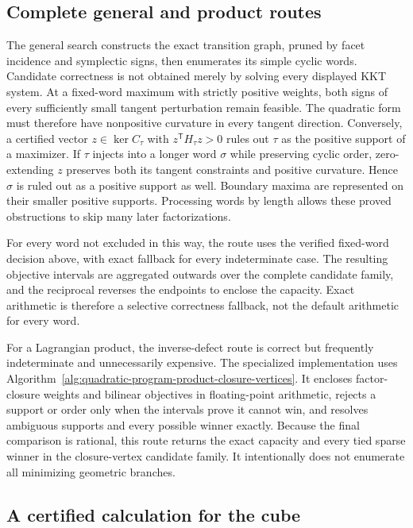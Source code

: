 \subsection{Complete general and product routes}

The general search constructs the exact transition graph, pruned by facet
incidence and symplectic signs, then enumerates its simple cyclic words. Candidate
correctness is not obtained merely by solving every displayed KKT system. At a
fixed-word maximum with strictly positive weights, both signs of every
sufficiently small tangent perturbation remain feasible. The quadratic form
must therefore have nonpositive curvature in every tangent direction.
Conversely, a certified vector \(z\in\ker C_\tau\) with
\(z^{\mathsf T}H_\tau z>0\) rules out \(\tau\) as the positive support
of a maximizer. If \(\tau\) injects into a
longer word \(\sigma\) while preserving cyclic order, zero-extending \(z\)
preserves both its tangent constraints and positive curvature.  Hence
\(\sigma\) is ruled out as a positive support as well. Boundary maxima
are represented on their smaller positive supports. Processing words by length allows these
proved obstructions to skip many later factorizations.

For every word not excluded in this way, the route uses the verified
fixed-word decision above, with exact fallback for every indeterminate case.
The resulting objective intervals are aggregated outwards over the complete
candidate family, and the reciprocal reverses the endpoints to enclose the
capacity.  Exact arithmetic is therefore a selective correctness fallback,
not the default arithmetic for every word.

For a Lagrangian product, the inverse-defect route is correct but frequently
indeterminate and unnecessarily expensive.  The specialized implementation
uses Algorithm~\ref{alg:quadratic-program-product-closure-vertices}.  It
encloses factor-closure weights and bilinear objectives in floating-point
arithmetic, rejects a support or order only when the intervals prove it cannot
win, and resolves ambiguous supports and every possible winner exactly.
Because the final comparison is rational, this route returns the exact
capacity and every tied sparse winner in the closure-vertex candidate family.
It intentionally does not enumerate all minimizing geometric branches.

\subsection{A certified calculation for the cube}

